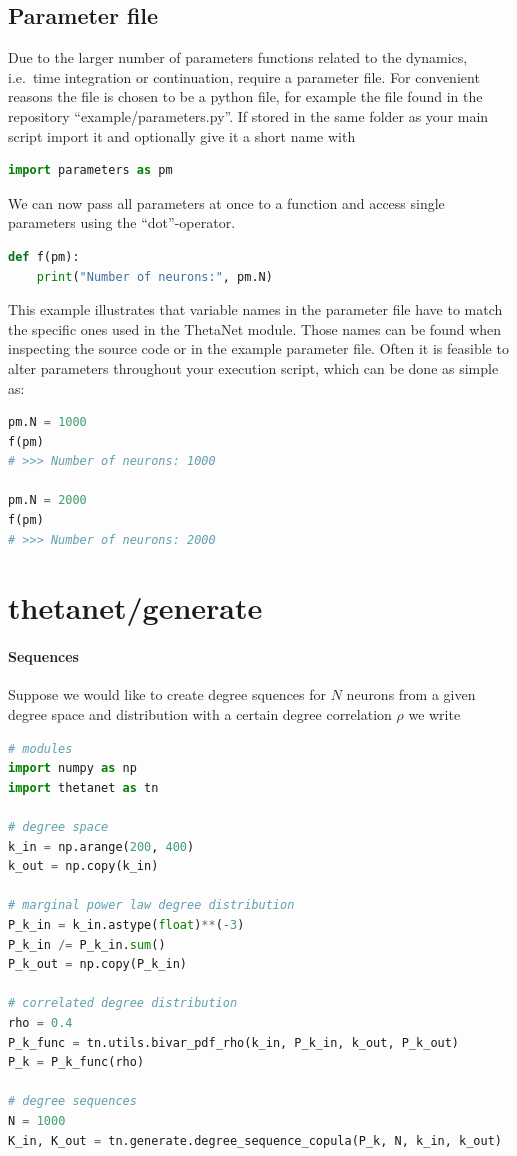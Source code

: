 \documentclass[bibliography=totoc, twoside]{article}
\numberwithin{equation}{section}
\begin{document}
\subsection*{Parameter file}
Due to the larger number of parameters functions related to the dynamics, i.e.\ time integration or continuation, require a parameter file.
For convenient reasons the file is chosen to be a python file, for example the file found in the repository ``example/parameters.py''.
If stored in the same folder as your main script import it and optionally give it a short name with
\begin{lstlisting}[language=python]
import parameters as pm
\end{lstlisting}
We can now pass all parameters at once to a function and access single parameters using the ``dot''-operator.
\begin{lstlisting}[language=python]
def f(pm):
    print("Number of neurons:", pm.N)
\end{lstlisting}
This example illustrates that variable names in the parameter file have to match the specific ones used in the ThetaNet module.
Those names can be found when inspecting the source code or in the example parameter file.
Often it is feasible to alter parameters throughout your execution script, which can be done as simple as:
\begin{lstlisting}[language=python]
pm.N = 1000
f(pm)
# >>> Number of neurons: 1000

pm.N = 2000
f(pm)
# >>> Number of neurons: 2000
\end{lstlisting}

\section{thetanet/generate}
\paragraph*{Sequences}
Suppose we would like to create degree squences for $N$ neurons from a given degree space and distribution with a certain degree correlation $\rho$ we write
\begin{lstlisting}[language=python]
# modules
import numpy as np
import thetanet as tn

# degree space
k_in = np.arange(200, 400)
k_out = np.copy(k_in)

# marginal power law degree distribution
P_k_in = k_in.astype(float)**(-3)
P_k_in /= P_k_in.sum()
P_k_out = np.copy(P_k_in)

# correlated degree distribution
rho = 0.4
P_k_func = tn.utils.bivar_pdf_rho(k_in, P_k_in, k_out, P_k_out)
P_k = P_k_func(rho)

# degree sequences
N = 1000
K_in, K_out = tn.generate.degree_sequence_copula(P_k, N, k_in, k_out)
\end{lstlisting}
\end{document}
